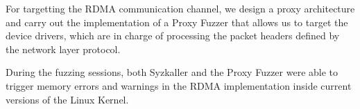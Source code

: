 For targetting the RDMA communication channel, we design a proxy architecture and carry out the implementation
of a Proxy Fuzzer that allows us to target the device drivers, which are in charge of processing the packet headers
defined by the network layer protocol.

During the fuzzing sessions, both Syzkaller and the Proxy Fuzzer were able to trigger
memory errors and warnings in the RDMA implementation inside current versions of the Linux Kernel.
